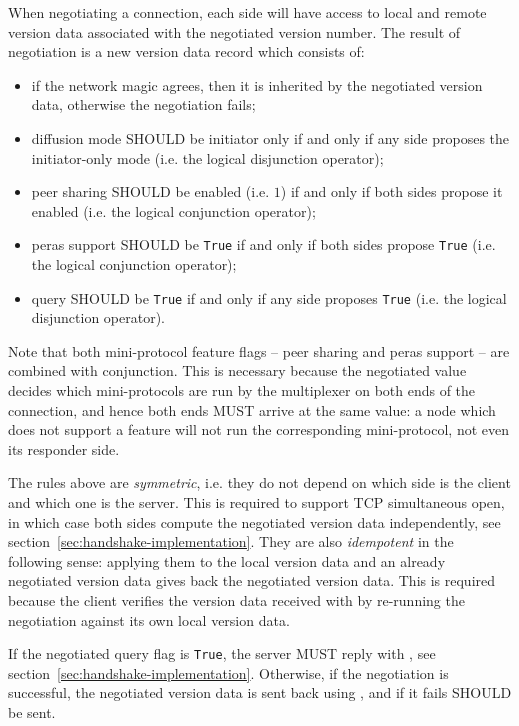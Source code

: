 When negotiating a connection, each side will have access to local and remote
version data associated with the negotiated version number.  The result of
negotiation is a new version data record which consists of:
\begin{itemize}\label{alg:node-to-node-negotiation}
  \item if the network magic agrees, then it is inherited by the negotiated version
    data, otherwise the negotiation fails;
  \item diffusion mode SHOULD be initiator only if and only if any side proposes the
    initiator-only mode (i.e. the logical disjunction operator);
  \item peer sharing SHOULD be enabled (i.e. $1$) if and only if both sides
    propose it enabled (i.e. the logical conjunction operator);
  \item peras support SHOULD be \texttt{True} if and only if both sides propose
    \texttt{True} (i.e. the logical conjunction operator);
  \item query SHOULD be \texttt{True} if and only if any side proposes
    \texttt{True} (i.e. the logical disjunction operator).
\end{itemize}
Note that both mini-protocol feature flags -- peer sharing and peras support
-- are combined with conjunction.  This is necessary because the negotiated
value decides which mini-protocols are run by the multiplexer on both ends of
the connection, and hence both ends MUST arrive at the same value: a node
which does not support a feature will not run the corresponding mini-protocol,
not even its responder side.

The rules above are \emph{symmetric}, i.e. they do not depend on which side is
the client and which one is the server.  This is required to support TCP
simultaneous open, in which case both sides compute the negotiated version
data independently, see section~\ref{sec:handshake-implementation}.  They are
also \emph{idempotent} in the following sense: applying them to the local
version data and an already negotiated version data gives back the negotiated
version data.  This is required because the client verifies the version data
received with \MsgAcceptVersion{} by re-running the negotiation against its
own local version data.

If the negotiated query flag is \texttt{True}, the server MUST reply with
\MsgQueryReply{}, see section~\ref{sec:handshake-implementation}.  Otherwise,
if the negotiation is successful, the negotiated version data is sent back
using \MsgAcceptVersion{}, and if it fails \MsgRefuse{} SHOULD be sent.

